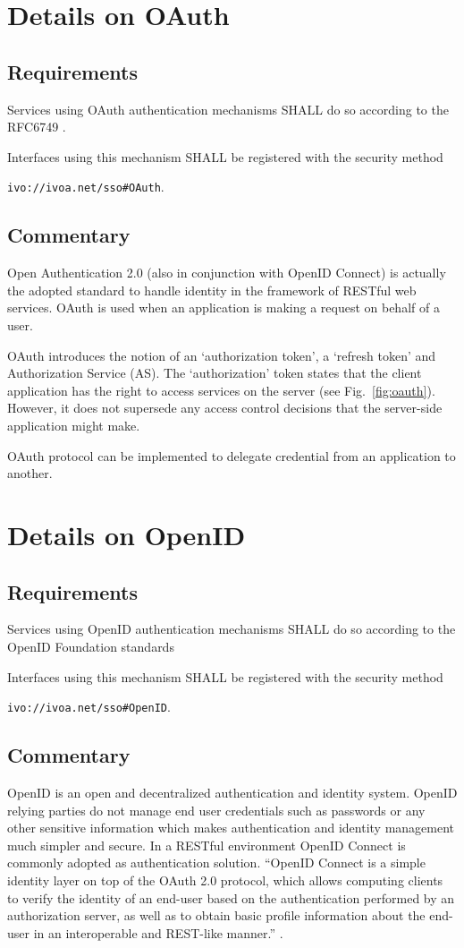 \documentclass[11pt,a4paper]{ivoa}
\begin{document}
\section{Details on OAuth}
\subsection{Requirements}
Services using OAuth authentication mechanisms SHALL do so according to the RFC6749 \citep{std:RFC6749}.

Interfaces using this mechanism SHALL  be registered with the security method 

\texttt{ivo://ivoa.net/sso\#OAuth}.


\subsection{Commentary}
Open Authentication 2.0 (also in conjunction with OpenID Connect) is actually the adopted standard 
to handle identity in the framework of RESTful web services. 
OAuth is used when an application is making a request on behalf of a user.

OAuth introduces the notion of an `authorization token', a `refresh token' and Authorization Service (AS). 
The `authorization' token states that the client application has the right to access services on the server  (see Fig.~\ref{fig:oauth}). 
However, it does not supersede any access control decisions that the server-side application might make.

OAuth protocol can be implemented  to delegate credential from an application to another.

\section{Details on OpenID}
\subsection{Requirements}
Services using OpenID authentication mechanisms SHALL do so according to the OpenID Foundation standards \citep{std:openid}
  
Interfaces using this mechanism SHALL  be registered with the security method 

\texttt{ivo://ivoa.net/sso\#OpenID}.

  
\subsection{Commentary}
OpenID is an open and decentralized authentication and identity system. OpenID relying parties do not manage end user credentials 
such as passwords or any other sensitive information which makes authentication and identity management much simpler and secure.
In a RESTful environment OpenID Connect \citep{std:openidconnect} is commonly adopted as authentication solution. ``OpenID Connect  is a simple identity 
layer on top of the OAuth 2.0 protocol, which allows computing clients to verify the identity of an end-user based on the authentication
 performed by an authorization server, as well as to obtain basic profile information about the end-user in an interoperable and REST-like manner.'' \citep{std:openid}.
  
\end{document}
